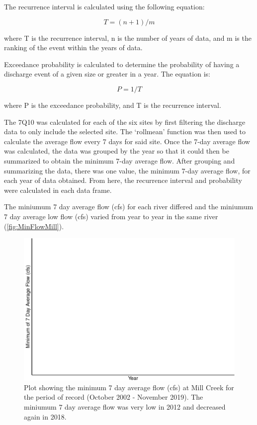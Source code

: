 \documentclass[12pt,]{article}
\begin{document}
The recurrence interval is calculated using the following equation:

\[T = (n+1)/m\]

where T is the recurrence interval, n is the number of years of data,
and m is the ranking of the event within the years of data.

Exceedance probability is calculated to determine the probability of
having a discharge event of a given size or greater in a year. The
equation is:

\[P = 1/T\]

where P is the exceedance probability, and T is the recurrence interval.

The 7Q10 was calculated for each of the six sites by first filtering the
discharge data to only include the selected site. The `rollmean'
function was then used to calculate the average flow every 7 days for
said site. Once the 7-day average flow was calculated, the data was
grouped by the year so that it could then be summarized to obtain the
minimum 7-day average flow. After grouping and summarizing the data,
there was one value, the minimum 7-day average flow, for each year of
data obtained. From here, the recurrence interval and probability were
calculated in each data frame.

The miniumum 7 day average flow (cfs) for each river differed and the
miniumum 7 day average low flow (cfs) varied from year to year in the
same river (\autoref{fig:MinFlowMill}).

\begin{figure}
\centering
\includegraphics{Missouri-Reasearch-Project---FINAL_files/figure-latex/MinFlowMill-1.pdf}
\caption{\label{fig:MinFlowMill}Plot showing the minimum 7 day average
flow (cfs) at Mill Creek for the period of record (October 2002 -
November 2019). The miniumum 7 day average flow was very low in 2012 and
decreased again in 2018.}
\end{figure}
\end{document}
